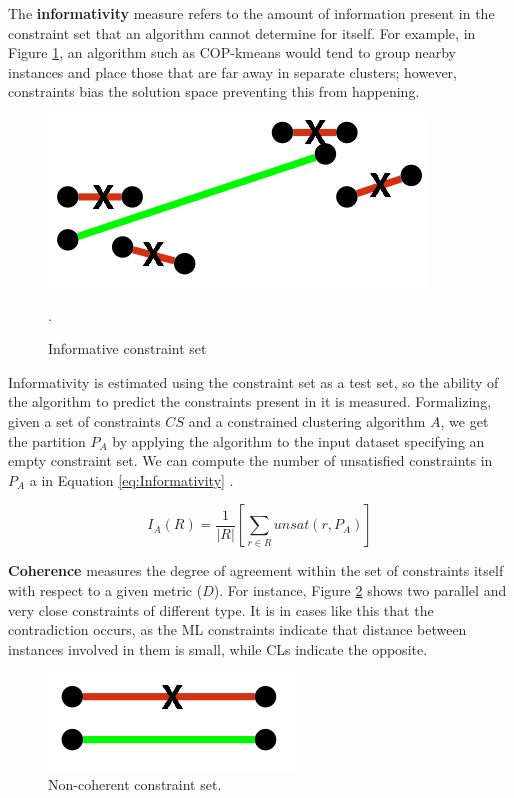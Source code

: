 The \textbf{informativity} measure refers to the amount of information present in the constraint set that an algorithm cannot determine for itself. For example, in Figure \ref{fig:Informativity}, an algorithm such as COP-kmeans would tend to group nearby instances and place those that are far away in separate clusters; however, constraints bias the solution space preventing this from happening. 

\begin{figure}[!h]
	\centering
	\includegraphics[scale=0.4]{gfx/ConstClust/Inform/Inform} 
	\caption[Informative constraint set.]{Informative constraint set \cite{davidson2007survey}}\label{fig:Informativity}.
\end{figure}


Informativity is estimated using the constraint set as a test set, so the ability of the algorithm to predict the constraints present in it is measured. Formalizing, given a set of constraints $CS$ and a constrained clustering algorithm $A$, we get the partition $P_A$ by applying the algorithm to the input dataset specifying an empty constraint set. We can compute the number of unsatisfied constraints in $P_A$ a in Equation \ref{eq:Informativity} \cite{davidson2007survey}.

\begin{equation}
I_A(R) = \frac{1}{|R|}\left[ \sum_{r \in R} unsat(r, P_A) \right] 
\label{eq:Informativity}
\end{equation}

\textbf{Coherence} measures the degree of agreement within the set of constraints itself with respect to a given metric ($D$). For instance, Figure \ref{fig:Coherence} shows two parallel and very close constraints of different type. It is in cases like this that the contradiction occurs, as the \acf{ML} constraints indicate that distance between instances involved in them is small, while \acf{CL}s indicate the opposite.

\begin{figure}[!h]
	\centering
	\includegraphics[scale=0.4]{gfx/ConstClust/Coherencia/Coher1}
	\caption[Non-coherent constraint set.]{Non-coherent constraint set. \cite{davidson2007survey}}\label{fig:Coherence}
\end{figure}

